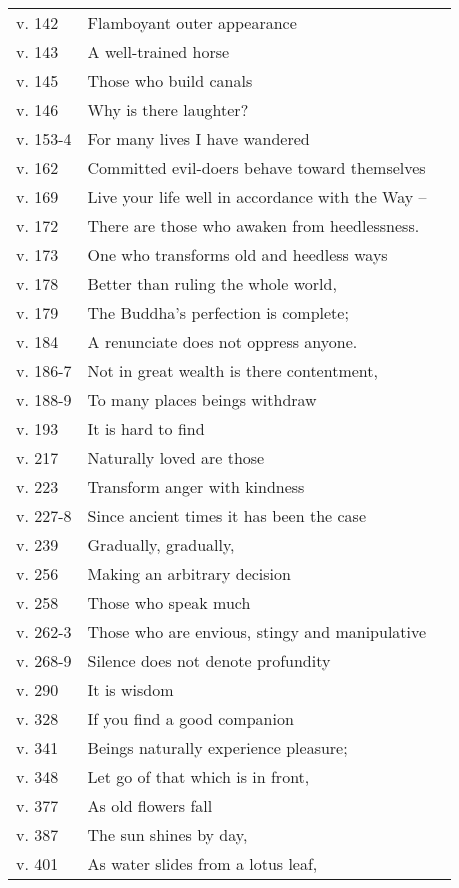 {\begin{longtable}[c]{llr}
v. 142 & Flamboyant outer appearance & \pageref{dhp-142}\\
v. 143 & A well-trained horse & \pageref{dhp-143}\\
v. 145 & Those who build canals & \pageref{dhp-145}\\
v. 146 & Why is there laughter? & \pageref{dhp-146}\\
v. 153-4 & For many lives I have wandered & \pageref{dhp-153}\\
v. 162 & Committed evil-doers behave toward themselves & \pageref{dhp-162}\\
v. 169 & Live your life well in accordance with the Way -- & \pageref{dhp-169}\\
v. 172 & There are those who awaken from heedlessness. & \pageref{dhp-172}\\
v. 173 & One who transforms old and heedless ways & \pageref{dhp-173}\\
v. 178 & Better than ruling the whole world, & \pageref{dhp-178}\\
v. 179 & The Buddha's perfection is complete; & \pageref{dhp-179}\\
v. 184 & A renunciate does not oppress anyone. & \pageref{dhp-184}\\
v. 186-7 & Not in great wealth is there contentment, & \pageref{dhp-186}\\
v. 188-9 & To many places beings withdraw & \pageref{dhp-188}\\
v. 193 & It is hard to find & \pageref{dhp-193}\\
v. 217 & Naturally loved are those & \pageref{dhp-217}\\
v. 223 & Transform anger with kindness & \pageref{dhp-223}\\
v. 227-8 & Since ancient times it has been the case & \pageref{dhp-227}\\
v. 239 & Gradually, gradually, & \pageref{dhp-239}\\
v. 256 & Making an arbitrary decision & \pageref{dhp-256}\\
v. 258 & Those who speak much & \pageref{dhp-258}\\
v. 262-3 & Those who are envious, stingy and manipulative & \pageref{dhp-262}\\
v. 268-9 & Silence does not denote profundity & \pageref{dhp-268}\\
v. 290 & It is wisdom & \pageref{dhp-290}\\
v. 328 & If you find a good companion & \pageref{dhp-328}\\
v. 341 & Beings naturally experience pleasure; & \pageref{dhp-341}\\
v. 348 & Let go of that which is in front, & \pageref{dhp-348}\\
v. 377 & As old flowers fall & \pageref{dhp-377}\\
v. 387 & The sun shines by day, & \pageref{dhp-387}\\
v. 401 & As water slides from a lotus leaf, & \pageref{dhp-401}\\
\end{longtable}

}

